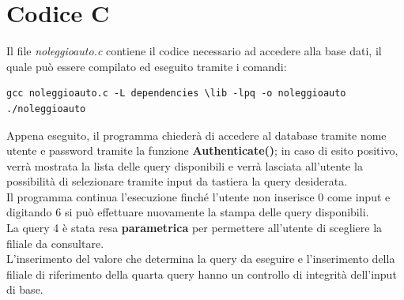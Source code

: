 \documentclass[10pt,a4paper]{article}
\begin{document}
\section{Codice C}
Il file \textit{noleggioauto.c} contiene il codice necessario ad accedere alla base dati, il quale può essere compilato ed eseguito tramite i comandi:
\begin{verbatim}
gcc noleggioauto.c -L dependencies \lib -lpq -o noleggioauto
./noleggioauto
\end{verbatim}   
Appena eseguito, il programma chiederà di accedere al database tramite nome utente e password tramite la funzione \textbf{Authenticate()};
in caso di esito positivo, verrà mostrata la lista delle query disponibili e verrà lasciata all'utente la possibilità di selezionare tramite input da tastiera la query desiderata. \\
Il programma continua l'esecuzione finché l'utente non inserisce 0 come input e digitando 6 si può effettuare nuovamente la stampa delle query disponibili.\\
La query 4 è stata resa \textbf{parametrica} per permettere all'utente di scegliere la filiale da consultare.\\ L'inserimento del valore che determina la query da eseguire e l'inserimento della filiale di riferimento della quarta query hanno un controllo di integrità dell'input di base.
\end{document}
